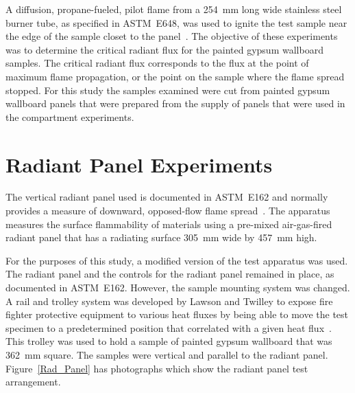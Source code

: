 \documentclass[twoside]{uocthesis}
\begin{document}
{A diffusion, propane-fueled, pilot flame from a 254~mm long wide stainless steel burner tube, as specified in ASTM~E648, was used to ignite the test sample near the edge of the sample closet to the panel~\cite{ASTM_E648}. The objective of these experiments was to determine the critical radiant flux for the painted gypsum wallboard samples.  The critical radiant flux corresponds to the flux at the point of maximum flame propagation, or the point on the sample where the flame spread stopped. For this study the samples examined were cut from painted gypsum wallboard panels that were prepared from the supply of panels that were used in the compartment experiments.  



\section{Radiant Panel Experiments}

The vertical radiant panel used is documented in ASTM~E162 and normally provides a measure of downward, opposed-flow flame spread~\cite{ASTM_E162}.  The apparatus measures the surface flammability of materials using a pre-mixed air-gas-fired radiant panel that has a radiating surface 305~mm wide by 457~mm high.

For the purposes of this study, a modified version of the test apparatus was used.  The radiant panel and the controls for the radiant panel remained in place, as documented in ASTM~E162. However, the sample mounting system was changed. A rail and trolley system was developed by Lawson and Twilley to expose fire fighter protective equipment to various heat fluxes by being able to move the test specimen to a predetermined position that correlated with a given heat flux~\cite{Lawson:1999}.  This trolley was used to hold a sample of painted gypsum wallboard that was 362~mm square.  The samples were vertical and parallel to the radiant panel. Figure~\ref{Rad_Panel} has photographs which show the radiant panel test arrangement.

}
\end{document}
